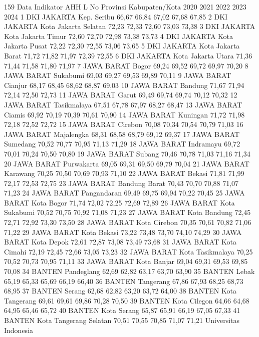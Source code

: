 159
Data Indikator AHH L
No Provinsi Kabupaten/Kota 2020 2021 2022 2023 2024
1 DKI JAKARTA Kep. Seribu 66,67 66,84 67,02 67,68 67,85
2 DKI JAKARTA Kota Jakarta Selatan 72,23 72,33 72,60 73,03 73,38
3 DKI JAKARTA Kota Jakarta Timur 72,60 72,70 72,98 73,38 73,73
4 DKI JAKARTA Kota Jakarta Pusat 72,22 72,30 72,55 73,06 73,65
5 DKI JAKARTA Kota Jakarta Barat 71,72 71,82 71,97 72,39 72,55
6 DKI JAKARTA Kota Jakarta Utara 71,36 71,44 71,58 71,80 71,97
7 JAWA BARAT Bogor 69,24 69,52 69,72 69,97 70,20
8 JAWA BARAT Sukabumi 69,03 69,27 69,53 69,89 70,11
9 JAWA BARAT Cianjur 68,17 68,45 68,62 68,87 69,03
10 JAWA BARAT Bandung 71,67 71,94 72,14 72,50 72,73
11 JAWA BARAT Garut 69,49 69,74 69,74 70,12 70,32
12 JAWA BARAT Tasikmalaya 67,51 67,78 67,97 68,27 68,47
13 JAWA BARAT Ciamis 69,92 70,19 70,39 70,61 70,90
14 JAWA BARAT Kuningan 71,72 71,98 72,18 72,52 72,72
15 JAWA BARAT Cirebon 70,08 70,34 70,54 70,79 71,03
16 JAWA BARAT Majalengka 68,31 68,58 68,79 69,12 69,37
17 JAWA BARAT Sumedang 70,52 70,77 70,95 71,13 71,29
18 JAWA BARAT Indramayu 69,72 70,01 70,24 70,50 70,80
19 JAWA BARAT Subang 70,46 70,78 71,03 71,16 71,34
20 JAWA BARAT Purwakarta 69,05 69,31 69,50 69,79 70,04
21 JAWA BARAT Karawang 70,25 70,50 70,69 70,93 71,10
22 JAWA BARAT Bekasi 71,81 71,99 72,17 72,53 72,75
23 JAWA BARAT Bandung Barat 70,43 70,70 70,88 71,07 71,23
24 JAWA BARAT Pangandaran 69,49 69,75 69,94 70,22 70,45
25 JAWA BARAT Kota Bogor 71,74 72,02 72,25 72,69 72,89
26 JAWA BARAT Kota Sukabumi 70,52 70,75 70,92 71,08 71,23
27 JAWA BARAT Kota Bandung 72,45 72,71 72,92 73,30 73,50
28 JAWA BARAT Kota Cirebon 70,35 70,61 70,82 71,06 71,22
29 JAWA BARAT Kota Bekasi 73,22 73,48 73,70 74,10 74,29
30 JAWA BARAT Kota Depok 72,61 72,87 73,08 73,49 73,68
31 JAWA BARAT Kota Cimahi 72,19 72,45 72,66 73,05 73,23
32 JAWA BARAT Kota Tasikmalaya 70,25 70,52 70,73 70,95 71,11
33 JAWA BARAT Kota Banjar 69,04 69,31 69,53 69,85 70,08
34 BANTEN Pandeglang 62,69 62,82 63,17 63,70 63,90
35 BANTEN Lebak 65,19 65,33 65,69 66,19 66,40
36 BANTEN Tangerang 67,86 67,93 68,25 68,73 68,95
37 BANTEN Serang 62,68 62,82 63,20 63,72 64,00
38 BANTEN Kota Tangerang 69,61 69,61 69,86 70,28 70,50
39 BANTEN Kota Cilegon 64,66 64,68 64,95 65,46 65,72
40 BANTEN Kota Serang 65,87 65,91 66,19 67,05 67,33
41 BANTEN Kota Tangerang Selatan 70,51 70,55 70,85 71,07 71,21
Universitas Indonesia


